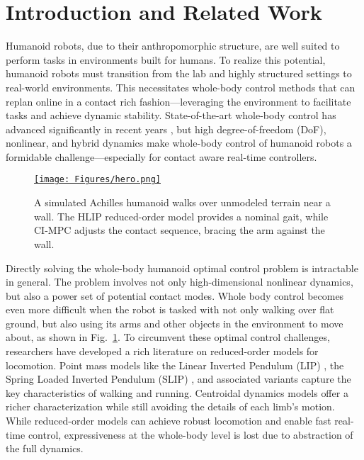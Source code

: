 \section{Introduction and Related Work}\label{sec:introduction}
Humanoid robots, due to their anthropomorphic structure, are well suited to perform tasks in environments built for humans. 
To realize this potential, humanoid robots must transition from the lab and highly structured settings to real-world environments.  This necessitates whole-body control methods that can replan online in a contact rich fashion---leveraging the environment to facilitate tasks and achieve dynamic stability.  
State-of-the-art whole-body control has advanced significantly in recent years \cite{kuindersma2016optimization, khazoom_humanoid_2022,khazoom2024tailoring}, but high degree-of-freedom (DoF), nonlinear, and hybrid dynamics make whole-body control of humanoid robots a formidable challenge---especially for contact aware real-time controllers.

\begin{figure}
    \centering
    \href{https://rom-cimpc.github.io/}
    {
    \texttt{[image: Figures/hero.png]}
    }
    \vspace{-14pt} 
    \caption{A simulated Achilles humanoid walks over unmodeled terrain near a wall. The HLIP reduced-order model provides a nominal gait, while CI-MPC adjusts the contact sequence, bracing the arm against the wall.}
    \label{fig:hero}
    \vspace{-18pt} 
\end{figure}
%
Directly solving the whole-body humanoid optimal control problem is intractable in general. The problem involves not only high-dimensional nonlinear dynamics, but also a power set of potential contact modes. Whole body control becomes even more difficult when the robot is tasked with not only walking over flat ground, but also using its arms and other objects in the environment to move about, as shown in Fig.~\ref{fig:hero}.
To circumvent these optimal control challenges, researchers have developed a rich literature on reduced-order models for locomotion. Point mass models like the Linear Inverted Pendulum (LIP) \cite{kajita20013d}, the Spring Loaded Inverted Pendulum (SLIP) \cite{blickhan1989spring, wensing_generation_2013}, and associated variants \cite{xiong_orbit_2019, dai2024multi,gong2020angular} capture the key characteristics of walking and running. Centroidal dynamics models \cite{orin2013centroidal, dai2014whole} offer a richer characterization while still avoiding the details of each limb's motion. While reduced-order models can achieve robust locomotion and enable fast real-time control, expressiveness at the whole-body level is lost due to abstraction of the full dynamics.

